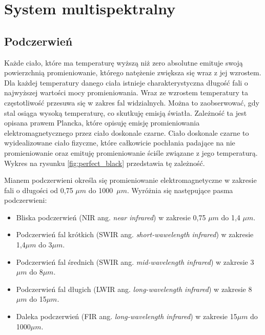 \chapter{System multispektralny}
\label{cha:multispectral}


 
\section{Podczerwień}

Każde ciało, które ma temperaturę wyższą niż zero absolutne emituje swoją powierzchnią promieniowanie, którego natężenie zwiększa się wraz z jej wzrostem.
Dla każdej temperatury danego ciała istnieje charakterystyczna długość fali o najwyższej wartości mocy promieniowania. Wraz ze wzrostem temperatury ta częstotliwość przesuwa się w zakres fal widzialnych.
Można to zaobserwować, gdy stal osiąga wysoką temperaturę, co skutkuję emisją światła.
Zależność ta jest opisana prawem Plancka, które opisuję emisję promieniowania elektromagnetycznego przez ciało doskonale czarne.
Ciało doskonale czarne to wyidealizowane ciało fizyczne, które całkowicie pochłania padające na nie promieniowanie oraz emituję promieniowanie ściśle związane z jego temperaturą.
Wykres na rysunku \ref{fig:perfect_black} przedstawia tę zależność.

Mianem podczerwieni określa się promieniowanie elektromagnetyczne w zakresie fali o długości od 0,75 $\mu m$ do 1000~$\mu m$. Wyróżnia się następujące pasma podczerwieni:
\begin{itemize}
\item Bliska podczerwień (NIR ang. \textit{near infrared}) w zakresie 0,75 $\mu m$ do 1,4 $\mu m$.
\item Podczerwień fal krótkich (SWIR ang. \textit{short-wawelength infrared}) w zakresie 1,4$\mu m$ do 3$\mu m$.
\item Podczerwień fal średnich (SWIR ang. \textit{mid-wavelength infrared}) w zakresie 3$\mu m$ do 8$\mu m$.
\item Podczerwień fal długich (LWIR ang. \textit{long-wavelength infrared}) w zakresie 8$\mu m$ do 15$\mu m$.
\item Daleka podczerwień (FIR ang. \textit{long-wavelength infrared}) w zakresie 15$\mu m$ do 1000$\mu m$.
\end{itemize}


